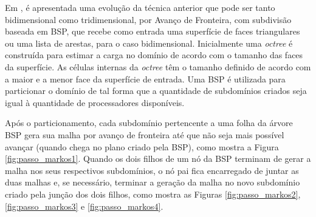  
Em \cite{bib:RepMarkos13}, é apresentada uma evolução da técnica anterior que pode ser tanto bidimensional como tridimensional, por Avanço de Fronteira, com subdivisão baseada em BSP, que recebe como entrada uma superfície de faces triangulares ou uma lista de arestas, para o caso bidimensional. Inicialmente uma \textit{octree} é construída para estimar a carga no domínio de acordo com o tamanho das faces da superfície. As células internas da \textit{octree} têm o tamanho definido de acordo com a maior e a menor face da superfície de entrada. Uma BSP é utilizada para particionar o domínio de tal forma que a quantidade de subdomínios criados seja igual à quantidade de processadores disponíveis.

Após o particionamento, cada subdomínio pertencente a uma folha da árvore BSP gera sua malha por avanço de fronteira até que não seja mais possível avançar (quando chega no plano criado pela BSP), como mostra a Figura \ref{fig:passo_markos1}. Quando os dois filhos de um nó da BSP terminam de gerar a malha nos seus respectivos subdomínios, o nó pai fica encarregado de juntar as duas malhas e, se necessário, terminar a geração da malha no novo subdomínio criado pela junção dos dois filhos, como mostra as Figuras \ref{fig:passo_markos2}, \ref{fig:passo_markos3} e \ref{fig:passo_markos4}.

